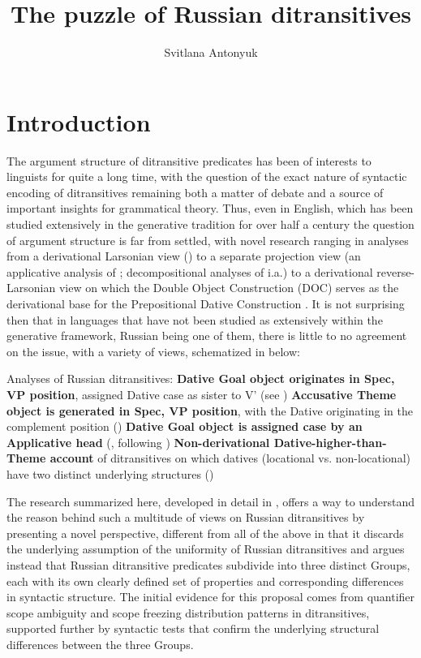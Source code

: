 \documentclass[output=paper,colorlinks,citecolor=brown,modfonts,nonflat]{langsci/langscibook}
\author{Svitlana Antonyuk	\affiliation{University of Graz}}
\title{The puzzle of Russian ditransitives}
\begin{document}
\maketitle

\section{Introduction}\label{sec:antonyuk:1}

The argument structure of ditransitive predicates has been of interests to linguists for quite a long time, with the question of the exact nature of syntactic encoding of ditransitives remaining both a matter of debate and a source of important insights for grammatical theory. Thus, even in English, which has been studied extensively in the generative tradition for over half a century the question of argument structure is far from settled, with novel research ranging in analyses from a derivational Larsonian view (\citealt{Larson1988, Larson2014}) to a separate projection view (an applicative analysis of \citealt{Marantz1993}; decompositional analyses of \citealt{Pesetsky1995, Harley1995Diss, Harley2002} i.a.) to a derivational reverse-Larsonian view on which the Double Object Construction (DOC) serves as the derivational base for the Prepositional Dative Construction \citep{Hallman2015}. It is not surprising then that in languages that have not been studied as extensively within the generative framework, Russian being one of them, there is little to no agreement on the issue, with a variety of views, schematized in  below:

\ea%
    \label{ex:antonyuk:1}
    Analyses of Russian ditransitives:
    \ea \textbf{Dative Goal object originates in Spec, VP position}, assigned Dative case as sister to V’ (see \citealt{HarbertToribio1991, GreenbergFranks1991, Franks1995, Richardson2007})
    \ex \textbf{Accusative Theme object is generated in Spec, VP position}, with the Dative originating in the complement position (\citealt{Bailyn1995, Bailyn2010, Bailyn2012, Titov2017})
    \ex \textbf{Dative Goal object is assigned case by an Applicative head} (\citealt{Dyakonova2005, Dyakonova2009}, following \citealt{Pylkkänen2002})
    \ex \textbf{Non-derivational Dative-higher-than-Theme account} of ditransitives on which datives (locational vs. non-locational) have two distinct underlying structures (\citealt{BonehNash2017})
    \z
\z

The research summarized here, developed in detail in \citet{Antonyuk2015}, offers a way to understand the reason behind such a multitude of views on Russian ditransitives by presenting a novel perspective, different from all of the above in that it discards the underlying assumption of the uniformity of Russian ditransitives and argues instead that Russian ditransitive predicates subdivide into three distinct Groups, each with its own clearly defined set of properties and corresponding differences in syntactic structure. The initial evidence for this proposal comes from quantifier scope ambiguity and scope freezing distribution patterns in ditransitives, supported further by syntactic tests that confirm the underlying structural differences between the three Groups.
\end{document}

